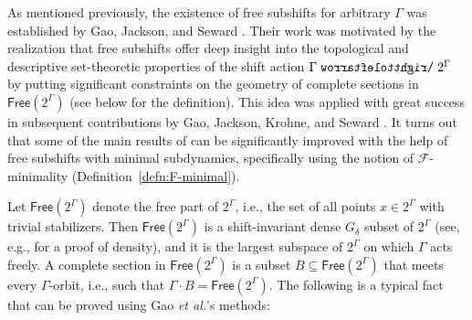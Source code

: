 \documentclass[11pt,reqno,psamsfonts]{amsart}
\theoremstyle{bfnote}
\theoremstyle{definition}
\theoremstyle{remark}
\newcommand{\0}{\varnothing}
\newcommand{\set}[1]{\{#1\}}
\newcommand{\emphd}[1]{{\fontseries{b}\selectfont\textsf{#1}}}
\newcommand{\acts}{\mathrel{\reflectbox{$\righttoleftarrow$}}}
\newcommand{\G}{\Gamma}
\newcommand{\Free}{\mathsf{Free}}
\newcommand{\Z}{\mathbb{Z}}
\newcommand{\iden}{\mathbf{1}}
\numberwithin{equation}{section}
\begin{document}
    As mentioned previously, the existence of free subshifts for arbitrary $\G$ was established by Gao, Jackson, and Seward \cite{GJS1,GJS2}. Their work 
%
 was motivated by the realization that free subshifts offer deep insight into the topological and descriptive set-theoretic properties of %
 the shift action $\G \acts 2^\G$ %
 by putting significant constraints on the geometry of complete sections in $\Free(2^\G)$ (see below for the definition). This idea was applied with great success in subsequent contributions by
    Gao, Jackson, Krohne, and Seward \cite{GJKS_Borel,GJKS_continuous}. %
    It turns out that some of the %
    main results of %
    \cite{GJKS_Borel}
    can be significantly improved with the help of free subshifts with minimal subdynamics, %
    specifically using the notion of $\mathcal{F}$-minimality (Definition~\ref{defn:F-minimal}).
    
    Let $\Free(2^\G)$ denote the \emphd{free part} of $2^\G$, i.e., the set of all points $x \in 2^\G$ %
    with trivial stabilizers.
    Then $\Free(2^\G)$ is a shift-invariant dense $G_\delta$ subset of $2^\G$ %
    (see, e.g.,
    \cite[Lem.~2.3]{BernoulliDisjointness} for a proof of density), and it is the largest subspace of $2^\G$ on which $\G$ acts freely. %
    A \emphd{complete section} in $\Free(2^\G)$ is a subset $B \subseteq \Free(2^\G)$ that meets every $\G$-orbit, i.e.,
    such that
    $\G \cdot B = \Free(2^\G)$. %
    The following is a typical fact that can be proved using Gao \emph{et al.}'s methods:
\end{document}
